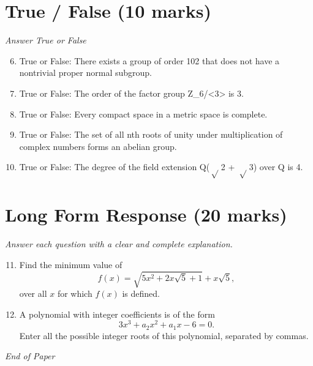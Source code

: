 \documentclass[12pt]{article}
\begin{document}
\section*{True / False (10 marks)}
\textit{Answer True or False}
\begin{enumerate}[label=\arabic*.]
\setcounter{enumi}{5}
\item True or False: There exists a group of order 102 that does not have a nontrivial proper normal subgroup.
\item True or False: The order of the factor group Z\_6/\textless{}3\textgreater{} is 3.
\item True or False: Every compact space in a metric space is complete.
\item True or False: The set of all nth roots of unity under multiplication of complex numbers forms an abelian group.
\item True or False: The degree of the field extension Q(\ensuremath{\sqrt} 2 + \ensuremath{\sqrt} 3) over Q is 4.
\end{enumerate}

\section*{Long Form Response (20 marks)}
\textit{Answer each question with a clear and complete explanation.}
\begin{enumerate}[label=\arabic*.]
\setcounter{enumi}{10}
\item Find the minimum value of \[f(x) = \sqrt{5 x^2 + 2 x \sqrt{5} + 1} + x \sqrt{5},\]over all $x$ for which $f(x)$ is defined.
\item A polynomial with integer coefficients is of the form \[3 x^3 + a_2 x^2 + a_1 x - 6 = 0.\]Enter all the possible integer roots of this polynomial, separated by commas.
\end{enumerate}

\vfill
\noindent\textit{End of Paper}
\end{document}
